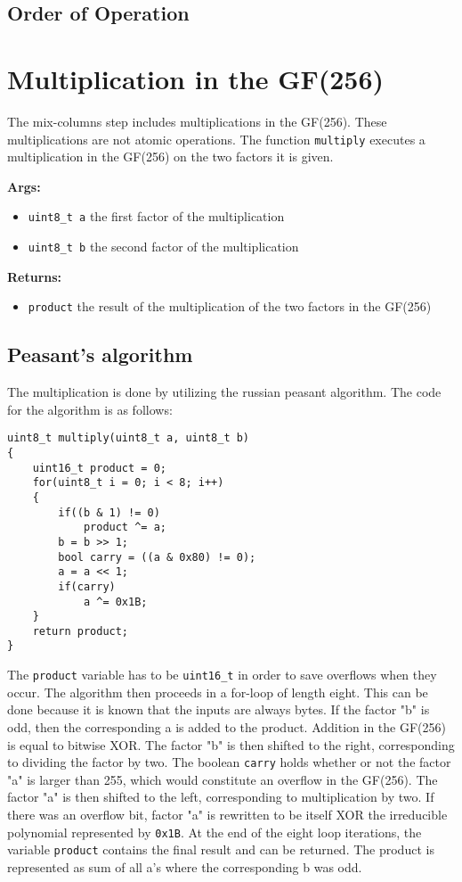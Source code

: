 \subsection{Order of Operation}


\section{Multiplication in the GF(256)}
\label{ch:dec_multiplication}
The mix-columns step includes multiplications in the GF(256). These multiplications are not atomic operations. The function \lstinline{multiply} executes a multiplication in the GF(256) on the two factors it is given.

\textbf{Args:}
\begin{itemize}
  \item \lstinline{uint8_t a} the first factor of the multiplication
  \item \lstinline{uint8_t b} the second factor of the multiplication
\end{itemize}

\textbf{Returns:}
\begin{itemize}
  \item \lstinline{product} the result of the multiplication of the two factors in the GF(256)
\end{itemize}

\subsection{Peasant's algorithm}
The multiplication is done by utilizing the russian peasant algorithm. The code for the algorithm is as follows:
\begin{lstlisting}
uint8_t multiply(uint8_t a, uint8_t b)
{
    uint16_t product = 0;
    for(uint8_t i = 0; i < 8; i++)
    {
        if((b & 1) != 0)
            product ^= a;
        b = b >> 1;
        bool carry = ((a & 0x80) != 0);
        a = a << 1;
        if(carry)
            a ^= 0x1B;
    }
    return product;
}
\end{lstlisting}

The \lstinline{product} variable has to be \lstinline{uint16_t} in order to save overflows when they occur. The algorithm then proceeds in a for-loop of length eight. This can be done because it is known that the inputs are always bytes. If the factor "b" is odd, then the corresponding a is added to the product. Addition in the GF(256) is equal to bitwise \ac{XOR}. The factor "b" is then shifted to the right, corresponding to dividing the factor by two. The boolean \lstinline{carry} holds whether or not the factor "a" is larger than 255, which would constitute an overflow in the GF(256). The factor "a" is then shifted to the left, corresponding to multiplication by two. If there was an overflow bit, factor "a" is rewritten to be itself \ac{XOR} the irreducible polynomial represented by \lstinline{0x1B}. At the end of the eight loop iterations, the variable \lstinline{product} contains the final result and can be returned. The product is represented as sum of all a's where the corresponding b was odd.

